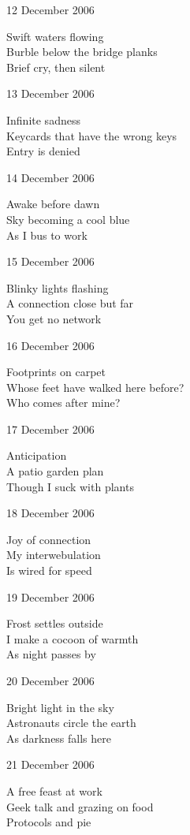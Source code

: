\documentclass[12pt]{article}
\begin{document}
12 December 2006

Swift waters flowing \\
Burble below the bridge planks \\
Brief cry, then silent

13 December 2006

Infinite sadness \\
Keycards that have the wrong keys \\
Entry is denied


\newpage

14 December 2006

Awake before dawn \\
Sky becoming a cool blue \\
As I bus to work

15 December 2006

Blinky lights flashing \\
A connection close but far \\
You get no network

16 December 2006

Footprints on carpet \\
Whose feet have walked here before? \\
Who comes after mine?

17 December 2006

Anticipation \\
A patio garden plan \\
Though I suck with plants

18 December 2006

Joy of connection \\
My interwebulation \\
Is wired for speed

19 December 2006

Frost settles outside \\
I make a cocoon of warmth \\
As night passes by


\newpage

20 December 2006 

Bright light in the sky \\
Astronauts circle the earth \\
As darkness falls here

21 December 2006

A free feast at work \\
Geek talk and grazing on food \\
Protocols and pie
\end{document}
